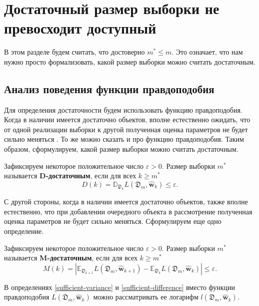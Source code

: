 \section{Достаточный размер выборки не превосходит доступный}\label{sec2}

В этом разделе будем считать, что достоверно $m^* \leqslant m$. Это означает, что нам нужно просто формализовать, какой размер выборки можно считать достаточным.

\subsection{Анализ поведения функции правдоподобия}

Для определения достаточности будем использовать функцию правдоподобия. Когда в наличии имеется достаточно объектов, вполне естественно ожидать, что от одной реализации выборки к другой полученная оценка параметров не будет сильно меняться \cite{Joseph1997, Joseph1995}. То же можно сказать и про функцию правдоподобия. Таким образом, сформулируем, какой размер выборки можно считать достаточным.

\begin{definition}
    \label{sufficient-variance}
    Зафиксируем некоторое положительное число $\varepsilon > 0$. Размер выборки $m^*$ называется \textbf{D-достаточным}, если для всех $k \geqslant m^*$
    \[ D(k) = \mathbb{D}_{\mathfrak{D}_k} L(\mathfrak{D}_m, \hat{\mathbf{w}}_{k}) \leqslant \varepsilon. \]
\end{definition}

С другой стороны, когда в наличии имеется достаточно объектов, также вполне естественно, что при добавлении очередного объекта в рассмотрение полученная оценка параметров не будет сильно меняться. Сформулируем еще одно определение.

\begin{definition}
    \label{sufficient-difference}
    Зафиксируем некоторое положительное число $\varepsilon > 0$. Размер выборки $m^*$ называется \textbf{M-достаточным}, если для всех $k \geqslant m^*$ 
    \[ M(k) = \left| \mathbb{E}_{\mathfrak{D}_{k+1}} L(\mathfrak{D}_m, \hat{\mathbf{w}}_{k+1}) - \mathbb{E}_{\mathfrak{D}_k} L(\mathfrak{D}_m, \hat{\mathbf{w}}_{k}) \right| \leqslant \varepsilon. \]
\end{definition}
\begin{note}
    В определениях \ref{sufficient-variance} и \ref{sufficient-difference} вместо функции правдоподобия $L(\mathfrak{D}_m, \hat{\mathbf{w}}_{k})$ можно рассматривать ее логарифм $l(\mathfrak{D}_m, \hat{\mathbf{w}}_{k})$.
\end{note}

